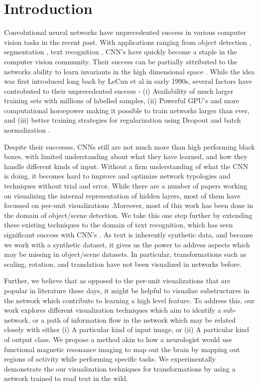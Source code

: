 \documentclass[10pt,twocolumn,letterpaper]{article}
\begin{document}
\section{Introduction}
Convolutional neural networks have unprecedented success in various computer vision tasks in the recent past.  With applications ranging from object detection \cite{}, segmentation \cite{}, text recognition \cite{}, CNN's have quickly become a staple in the computer vision community. Their success can be partially attributed to the networks ability to learn invariants in the high dimensional space \cite{}. While the idea was first introduced long back by LeCun et al in early 1990s, several factors have controbuted to their unprecedented success - (i) Availability of much larger training sets with millions of labelled samples, (ii) Powerful GPU's and more computational horsepower making it possible to train networks larger than ever, and (iii) better training strategies for regularization using Dropout \cite{wan2013regularization} and batch normalization \cite{ioffe2015batch}.

Despite their successes, CNNs still are not much more than high performing black boxes, with limited understanding about what they have learned, and how they handle different kinds of input. Without a firm understanding of what the CNN is doing, it becomes hard to improve and optimize network typologies and techniques without trial and error. While there are a number of papers working on visualizing the internal representation of hidden layers, most of them have focussed on per-unit visualizations \cite{yosinski2015understanding,mahendran2015understanding,zhou2014object}.Moreover, most of this work has been done in the domain of object/scene detection. We take this one step further by extending these existing techniques to the domain of text recognition, which has seen significant success with CNN's \cite{Jaderberg14,Jaderberg14c,Jaderberg14d}. As text is inherently synthetic data, and because we work with a synthetic dataset, it gives us the power to address aspects which may be missing in object/scene datasets. In particular, transformations such as scaling, rotation, and translation have not been visualized in networks before. 

Further, we believe that as opposed to the per-unit visualizations that are popular in literature these days, it might be helpful to visualize substructures in the network which contribute to learning a high level feature. To address this, our work explores different visualization techniques which aim to identify a sub-network, or a path of information flow in the network which may be related closely with either (i) A particular kind of input image, or (ii) A particular kind of output class. We propose a method akin to how a neurologist would use functional magnetic resonance imaging to map out the brain by mapping out regions of activity while performing specific tasks.\cite{friston1998event} We experimentally demonstrate the our visualization techniques for transformations by using a network trained to read text in the wild. 
\end{document}
